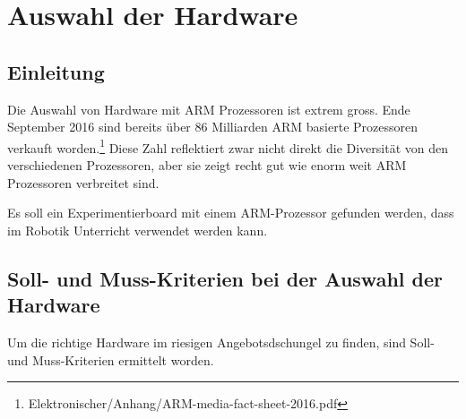 \chapter{Auswahl der Hardware}

\section{Einleitung}
Die Auswahl von Hardware mit ARM Prozessoren ist extrem gross.
Ende September 2016 sind bereits über 86 Milliarden ARM basierte Prozessoren verkauft worden.\footnote{Elektronischer/Anhang/ARM-media-fact-sheet-2016.pdf}
Diese Zahl reflektiert zwar nicht direkt die Diversität von den verschiedenen Prozessoren, aber sie zeigt recht gut wie enorm weit ARM Prozessoren verbreitet sind.

Es soll ein Experimentierboard mit einem ARM-Prozessor gefunden werden, dass im Robotik Unterricht verwendet werden kann.


\section{Soll- und Muss-Kriterien bei der Auswahl der Hardware}
Um die richtige Hardware im riesigen Angebotsdschungel zu finden, sind Soll- und Muss-Kriterien ermittelt worden.

